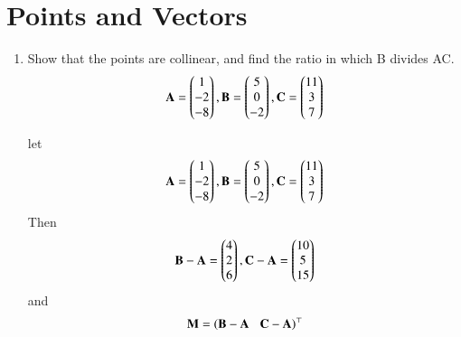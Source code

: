 \documentclass[journal,12pt,twocolumn]{IEEEtran}
\renewcommand\thesection{\arabic{section}}
\begin{document}
\section{Points and Vectors}
\renewcommand{\theequation}{\theenumi}
\begin{enumerate}[label=\thesection.\arabic*.,ref=\thesection.\theenumi]
\item Show that the points are collinear, and find the ratio in which B divides AC.
\begin{align}
\mathbf{A} = \begin{pmatrix}1\\-2\\-8\end{pmatrix}, \mathbf{B} =\begin{pmatrix}5\\0\\-2\end{pmatrix},
\mathbf{C} =\begin{pmatrix}11\\3\\7\end{pmatrix}
\end{align}
\solution

let
\begin{align}
\mathbf{A} = \begin{pmatrix}1\\-2\\-8\end{pmatrix}, \mathbf{B} =\begin{pmatrix}5\\0\\-2\end{pmatrix},
\mathbf{C} =\begin{pmatrix}11\\3\\7\end{pmatrix}
\end{align}  
Then
\begin{align}
 \mathbf{B} - \mathbf{A} = \begin{pmatrix}4\\2\\6\end{pmatrix},
\mathbf {C} - \mathbf {A} = \begin{pmatrix}10\\5\\15\end{pmatrix}
\end{align}
and
\begin{align}
\mathbf{M} = \left(\mathbf{B}-\mathbf{A} \hspace{0.3cm} \mathbf{C}-\mathbf{A}\right)^{\top}
\end{align}


\end{enumerate}
\end{document}
